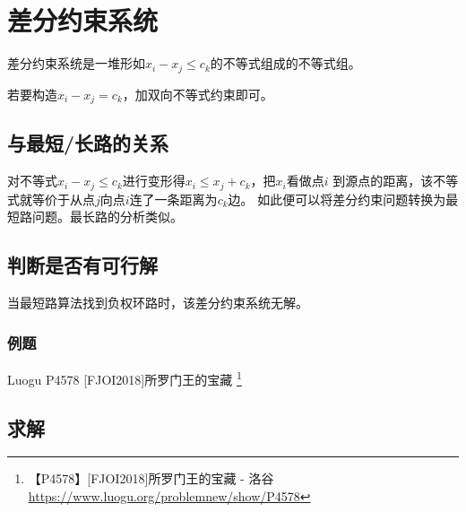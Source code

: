 \section{差分约束系统}
差分约束系统是一堆形如$x_i-x_j\leq c_k$的不等式组成的不等式组。

若要构造$x_i-x_j=c_k$，加双向不等式约束即可。

\subsection{与最短/长路的关系}
对不等式$x_i-x_j\leq c_k$进行变形得$x_i\leq x_j+c_k$，把$x_i$看做点$i$
到源点的距离，该不等式就等价于从点$j$向点$i$连了一条距离为$c_k$边。
如此便可以将差分约束问题转换为最短路问题。最长路的分析类似。

\subsection{判断是否有可行解}

当最短路算法找到负权环路时，该差分约束系统无解。

\subsubsection{例题}
Luogu P4578 [FJOI2018]所罗门王的宝藏
\footnote{【P4578】[FJOI2018]所罗门王的宝藏 - 洛谷
\url{https://www.luogu.org/problemnew/show/P4578}}

\subsection{求解}
